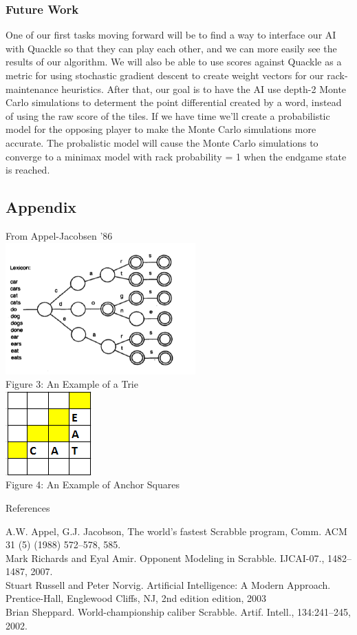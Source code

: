 \documentclass[12pt]{article}
\begin{document}
\subsubsection*{Future Work}
One of our first tasks moving forward will be to find a way to interface our AI with Quackle so that they can play each other, and we can more easily see the results of our algorithm. We will also be able to use scores against Quackle as a metric for using stochastic gradient descent to create weight vectors for our rack-maintenance heuristics. After that, our goal is to have the AI use depth-2 Monte Carlo simulations to determent the point differential created by a word, instead of using the raw score of the tiles. If we have time we'll create a probabilistic model for the opposing player to make the Monte Carlo simulations more accurate. The probalistic model will cause the Monte Carlo simulations to converge to a minimax model with rack probability = 1 when the endgame state is reached.
\clearpage
\begin{center}
\section*{Appendix}

  From Appel-Jacobsen '86\\
  \includegraphics[scale=0.6]{trie}\\
Figure 3: An Example of a Trie \\
\includegraphics{anchorexample}\\
Figure 4: An Example of Anchor Squares

\vspace{ 8cm }
{\Large References} 
\end{center}
A.W. Appel, G.J. Jacobson, The world’s fastest Scrabble program, Comm. ACM 31 (5) (1988) 572–578, 585. \\
Mark Richards and Eyal Amir. Opponent Modeling in Scrabble. IJCAI-07., 1482–1487, 2007. \\
Stuart Russell and Peter Norvig. Artificial Intelligence: A Modern Approach. Prentice-Hall,
Englewood Cliffs, NJ, 2nd edition edition, 2003 \\
Brian Sheppard. World-championship caliber Scrabble. Artif. Intell., 134:241–245, 2002. \\
\end{document}
